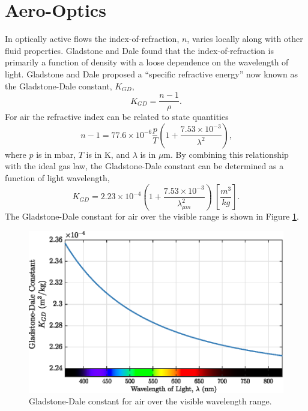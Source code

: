 \section{Aero-Optics}
In optically active flows the index-of-refraction, $n$, varies locally along with other fluid properties.
Gladstone and Dale \cite{Gladstone-1863-ND4wtDT9} found that the index-of-refraction is primarily a function of density with a loose dependence on the wavelength of light.
Gladstone and Dale proposed a ``specific refractive energy'' now known as the Gladstone-Dale constant, $K_{GD}$,
\begin{equation}
  K_{GD} = \frac{n-1}{\rho}\textrm{.}
  \label{eqn:02_gladstone_dale_constant}
\end{equation}
For air the refractive index can be related to state quantities \cite{Valley-1965-F3k3cmv6}
\begin{equation}
  n-1 = 77.6\times 10^{-6}\frac{p}{T}\left(1+\frac{7.53\times10^{-3}}{\lambda^2}\right)\textrm{,}
  \label{eqn:02_refractive_index_ptlambda}
\end{equation}
where $p$ is in mbar, $T$ is in K, and $\lambda$ is in $\mu$m.
By combining this relationship with the ideal gas law, the Gladstone-Dale constant can be determined as a function of light wavelength,
\begin{equation}
  K_{GD} = 2.23\times10^{-4}\left(1+\frac{7.53\times10^{-3}}{\lambda_{\mu m}^2}\right) \: \left[\frac{m^3}{kg}\right]\textrm{.}
  \label{eqn:02_gladstone_dale_wavelength}
\end{equation}
The Gladstone-Dale constant for air over the visible range is shown in Figure \ref{fig:02_gladstone_dale_wavelength}.
\begin{figure}
  \centering
  \includegraphics{../matlab/02_background/gladstone_dale_wavelength.eps}
  \caption{Gladstone-Dale constant for air over the visible wavelength range.}
  \label{fig:02_gladstone_dale_wavelength}
\end{figure}
